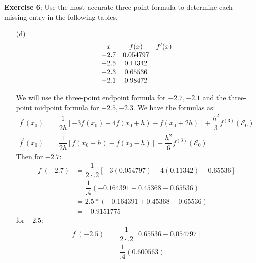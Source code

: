 \documentclass{article}
\begin{document}
\textbf{Exercise 6}: Use the most accurate three-point formula to determine each missing entry in the following tables.
    \begin{itemize}
        \item [(d)] \begin{align*}
            \begin{array}{ c c c }
                x    & f(x)     & f^{\prime}(x) \\
                -2.7 & 0.054797 &               \\
                -2.5 & 0.11342  &               \\
                -2.3 & 0.65536  &               \\
                -2.1 & 0.98472  &                 
            \end{array}
        \end{align*}
        \begin{answer}
            We will use the three-point endpoint formula for $-2.7, -2.1$ and the three-point midpoint formula for $-2.5, -2.3$. We have the formulas as:
                \begin{align*}
                    f^{\prime}(x_{0}) &= \dfrac{1}{2h}[-3f(x_{0}) + 4f(x_{0} + h) - f(x_{0} + 2h)] + \dfrac{h^{2}}{3}f^{(3)}(\mathcal{E}_{0}) \\
                    f^{\prime}(x_{0}) &= \dfrac{1}{2h}[f(x_{0} + h) - f(x_{0} - h)] - \dfrac{h^{2}}{6}f^{(3)}(\mathcal{E}_{0})                  
                \end{align*}
            Then for $-2.7$:
                \begin{align*}
                    f^{\prime}(-2.7) &= \dfrac{1}{2 \cdot .2}[-3(0.054797) + 4(0.11342) - 0.65536] \\
                                     &= \dfrac{1}{.4} (-0.164391 + 0.45368 - 0.65536)              \\
                                     &= 2.5 * (-0.164391 + 0.45368 - 0.65536)                      \\
                                     &= -0.9151775                                                   
                \end{align*}
            for $-2.5$:
                \begin{align*}
                    f^{\prime}(-2.5) &= \dfrac{1}{2 \cdot .2}[0.65536 - 0.054797] \\
                                     &= \dfrac{1}{.4}(0.600563)                  \\

\end{align*}
\end{answer}
\end{itemize}
\end{document}
